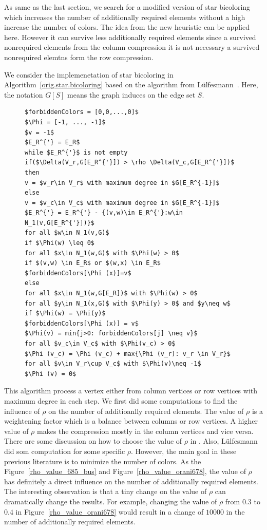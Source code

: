 \documentclass[12pt, twoside]{book}
\newcommand{\figref}[1]{Figure~\protect\ref{#1}}
\newcommand{\coderef}[1]{Algorithm~\protect\ref{#1}}
\begin{document}
As same as the last section, we search for a modified version of star bicoloring
which increases the number of additionally required elements without
a high increase the number of colors. The idea from the new heuristic
can be applied here. However it can survive less additionally required
elements since a survived nonrequired elements from the column compression
it is not necessary a survived nonrequired elemtns form the row compression.

We consider the implemenetation of star bicoloring in \coderef{orig.star.bicoloring} based on
the algorithm from Lülfesmann~\cite{Lulfesmann2012Fap}.
Here, the notation $G[S]$ means the graph induces on the edge set $S$.
\begin{figure}
\begin{lstlisting}[caption=A version of star bicoloring algorithm.,
label=orig.star.bicoloring,mathescape]
$forbiddenColors = [0,0,...,0]$
$\Phi = [-1, ..., -1]$
$v = -1$
$E_R^{'} = E_R$
while $E_R^{'}$ is not empty
if($\Delta(V_r,G[E_R^{'}]) > \rho \Delta(V_c,G[E_R^{'}])$ then
v = $v_r\in V_r$ with maximum degree in $G[E_R^{-1}]$
else
v = $v_c\in V_c$ with maximum degree in $G[E_R^{-1}]$
$E_R^{'} = E_R^{'} - {(v,w)\in E_R^{'}:w\in N_1(v,G[E_R^{'}])}$
for all $w\in N_1(v,G)$
if $\Phi(w) \leq 0$
for all $x\in N_1(w,G)$ with $\Phi(w) > 0$
if $(v,w) \in E_R$ or $(w,x) \in E_R$
$forbiddenColors[\Phi (x)]=v$
else
for all $x\in N_1(w,G[E_R])$ with $\Phi(w) > 0$
for all $y\in N_1(x,G)$ with $\Phi(y) > 0$ and $y\neq w$
if $\Phi(w) = \Phi(y)$
$forbiddenColors[\Phi (x)] = v$
$\Phi(v) = min{j>0: forbiddenColors[j] \neq v}$
for all $v_c\in V_c$ with $\Phi(v_c) > 0$
$\Phi (v_c) = \Phi (v_c) + max{\Phi (v_r): v_r \in V_r}$
for all $v\in V_r\cup V_c$ with $\Phi(v)\neq -1$
$\Phi (v) = 0$
\end{lstlisting}
\end{figure}
This algorithm process a vertex either from column vertices
or row vertices with maximum degree in each step.
We first did some computations to find the influence of $\rho$ on the
number of additioanlly required elements. The value of $\rho$ is a weightening factor which
is a balance between columns or row vertices. A higher value of $\rho$
makes the compression mostly in the column vertices and vice versa.
There are some discussion on how to choose the value of $\rho$ in
\cite{Gebremedhin05whatcolor}. Also,
Lülfesmann~\cite{Lulfesmann2012Fap,LulfesmannMaster} did som computation for some
specific $\rho$.
However, the main goal in these previous literature
is to minimize the number of colors.
As the \figref{rho_value_685_bus} and \figref{rho_value_orani678},
the value of $\rho$ has definitely a direct influence on
the number of additionally required elements.
The interesting observation is that a tiny change
on the value of $\rho$ can dramatically change the
results. For example, changing the value of $\rho$ from
$0.3$ to $0.4$ in \figref{rho_value_orani678} would result
in a change of $10000$ in the number of additionally required elements.
\end{document}
